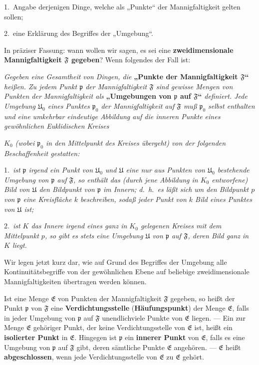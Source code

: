 \documentclass{article}
\begin{document}
1.\ Angabe derjenigen Dinge, welche als „Punkte“ der Mannigfaltigkeit gelten sollen;

2.\ eine Erklärung des Begriffes der „Umgebung“.

In präziser Fassung: wann wollen wir sagen, es sei eine \textbf{zweidimensionale Mannigfaltigkeit $\mathfrak{F}$ gegeben}? Wenn folgendes der Fall ist:

\emph{Gegeben eine Gesamtheit von Dingen, die} \textbf{„Punkte der Mannigfaltigkeit $\mathfrak{F}$“} \emph{heißen. Zu jedem Punkt $\mathfrak{p}$ der Mannigfaltigkeit $\mathfrak{F}$ sind gewisse Mengen von Punkten der Mannigfaltigkeit als} \textbf{„Umgebungen von $\mathfrak{p}$ auf $\mathfrak{F}$“} \emph{definiert. Jede Umgebung $\mathfrak{U}_0$ eines Punktes $\mathfrak{p}_0$ der Mannigfaltigkeit auf $\mathfrak{F}$ muß $\mathfrak{p}_0$ selbst enthalten und eine umkehrbar eindeutige Abbildung auf die inneren Punkte eines gewöhnlichen Euklidischen Kreises}

\emph{$K_0$ (wobei $\mathfrak{p}_0$ in den Mittelpunkt des Kreises übergeht) von der folgenden Beschaffenheit gestatten:}

1.\ \emph{ist $\mathfrak{p}$ irgend ein Punkt von $\mathfrak{U}_0$ und $\mathfrak{U}$ eine nur aus Punkten von $\mathfrak{U}_0$ bestehende Umgebung von $\mathfrak{p}$ auf $\mathfrak{F}$, so enthält das (durch jene Abbildung in $K_0$ entworfene) Bild von $\mathfrak{U}$ den Bildpunkt von $\mathfrak{p}$ im Innern; d.\ h.\ es läßt sich um den Bildpunkt $p$ von $\mathfrak{p}$ eine Kreisfläche $k$ beschreiben, sodaß jeder Punkt von $k$ Bild eines Punktes von $\mathfrak{U}$ ist;}

2.\ \emph{ist $K$ das Innere irgend eines ganz in $K_0$ gelegenen Kreises mit dem Mittelpunkt $p$, so gibt es stets eine Umgebung $\mathfrak{U}$ von $\mathfrak{p}$ auf $\mathfrak{F}$, deren Bild ganz in $K$ liegt.}

Wir legen jetzt kurz dar, wie auf Grund des Begriffes der Umgebung alle Kontinuitätsbegriffe von der gewöhnlichen Ebene auf beliebige zweidimensionale Mannigfaltigkeiten übertragen werden können.

Ist eine Menge $\mathfrak{E}$ von Punkten der Mannigfaltigkeit $\mathfrak{F}$ gegeben, so heißt der Punkt $\mathfrak{p}$ von $\mathfrak{F}$ eine \textbf{Verdichtungsstelle} (\textbf{Häufungspunkt}) der Menge $\mathfrak{E}$, falls in jeder Umgebung von $\mathfrak{p}$ auf $\mathfrak{F}$ unendlichviele Punkte von $\mathfrak{E}$ liegen. --- Ein zur Menge $\mathfrak{E}$ gehöriger Punkt, der keine Verdichtungsstelle von $\mathfrak{E}$ ist, heißt ein \textbf{isolierter Punkt} in $\mathfrak{E}$. Hingegen ist $\mathfrak{p}$ ein \textbf{innerer Punkt} von $\mathfrak{E}$, falls es eine Umgebung von $\mathfrak{p}$ auf $\mathfrak{F}$ gibt, deren sämtliche Punkte $\mathfrak{E}$ angehören. --- $\mathfrak{E}$ heißt \textbf{abgeschlossen}, wenn jede Verdichtungsstelle von $\mathfrak{E}$ zu $\mathfrak{E}$ gehört.
\end{document}
